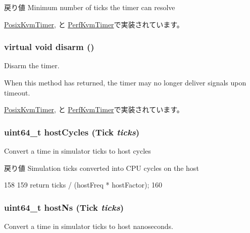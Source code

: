 \begin{DoxyReturn}{戻り値}
Minimum number of ticks the timer can resolve 
\end{DoxyReturn}


\hyperlink{classPosixKvmTimer_a02798cc202bebceef3ff0e3ff3d7b5b8}{PosixKvmTimer}, と \hyperlink{classPerfKvmTimer_a02798cc202bebceef3ff0e3ff3d7b5b8}{PerfKvmTimer}で実装されています。\hypertarget{classBaseKvmTimer_aaef5c4bcad609bff2d6580c368020346}{
\subsubsection[{disarm}]{\setlength{\rightskip}{0pt plus 5cm}virtual void disarm ()}}
\label{classBaseKvmTimer_aaef5c4bcad609bff2d6580c368020346}
Disarm the timer.

When this method has returned, the timer may no longer deliver signals upon timeout. 

\hyperlink{classPosixKvmTimer_a9882bfa120cede575461197f2a13cd8b}{PosixKvmTimer}, と \hyperlink{classPerfKvmTimer_a9882bfa120cede575461197f2a13cd8b}{PerfKvmTimer}で実装されています。\hypertarget{classBaseKvmTimer_ab987095ba5c55b83638d48c3b69693d4}{
\subsubsection[{hostCycles}]{\setlength{\rightskip}{0pt plus 5cm}uint64\_\-t hostCycles ({\bf Tick} {\em ticks})}}
\label{classBaseKvmTimer_ab987095ba5c55b83638d48c3b69693d4}
Convert a time in simulator ticks to host cycles

\begin{DoxyReturn}{戻り値}
Simulation ticks converted into CPU cycles on the host 
\end{DoxyReturn}



\begin{DoxyCode}
158                                     {
159         return ticks / (hostFreq * hostFactor);
160     }
\end{DoxyCode}
\hypertarget{classBaseKvmTimer_a1e40d82dba12b48d6298661480977ff9}{
\subsubsection[{hostNs}]{\setlength{\rightskip}{0pt plus 5cm}uint64\_\-t hostNs ({\bf Tick} {\em ticks})}}
\label{classBaseKvmTimer_a1e40d82dba12b48d6298661480977ff9}
Convert a time in simulator ticks to host nanoseconds.

